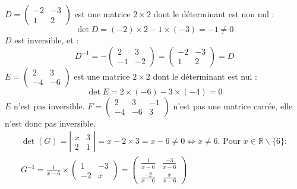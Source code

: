 {{$D=\left(\begin{array}{cc}-2 & -3 \\ 1 & 2\end{array}\right)$ est une matrice $2 \times 2$ dont le déterminant est non nul :
$$
\operatorname{det} D=(-2) \times 2-1 \times(-3)=-1 \neq 0
$$
$D$ est inversible, et :
$$
D^{-1}=-\left(\begin{array}{cc}
	2 & 3 \\
	-1 & -2
\end{array}\right)=\left(\begin{array}{cc}
	-2 & -3 \\
	1 & 2
\end{array}\right)=D
$$
$E=\left(\begin{array}{cc}2 & 3 \\ -4 & -6\end{array}\right)$ est une matrice $2 \times 2$ dont le déterminant est nul :
$$
\operatorname{det} E=2 \times(-6)-3 \times(-4)=0
$$
$E$ n'est pas inversible.
$F=\left(\begin{array}{lll}2 & 3 & -1 \\ -4 & -6 & 3\end{array}\right)$ n'est pas une matrice carrée, elle n'est donc pas inversible.
$$
\begin{array}{r}
	\operatorname{det}(G)=\left|\begin{array}{ll}
		x & 3 \\
		2 & 1
	\end{array}\right|=x-2 \times 3=x-6 \neq 0 \Leftrightarrow x \neq 6 . \text { Pour } x \in \mathbb{R} \backslash\{6\}: \\
	G^{-1}=\frac{1}{x-6} \times\left(\begin{array}{cc}
		1 & -3 \\
		-2 & x
	\end{array}\right)=\left(\begin{array}{cc}
		\frac{1}{x-6} & \frac{-3}{x-6} \\
		\frac{-2}{x-6} & \frac{x}{x-6}
	\end{array}\right)
\end{array}
$$ }}
